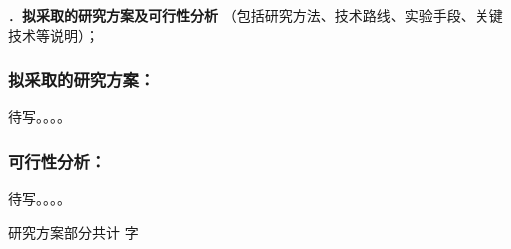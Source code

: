 {\sihao \color{MsBlue} ．{\bfseries 拟采取的研究方案及可行性分析} （包括研究方法、技术路线、实验手段、关键技术等说明）；}

\subsubsection{{\bfseries 拟采取的研究方案：}}

待写。。。。


\subsubsection{{\bfseries 可行性分析：}}

待写。。。。


\ifhandout
\else
\begin{center}
{\larger[2]\color{red}  研究方案部分共计 \wordcount 字 }
\end{center}
\fi


\vskip 5mm
